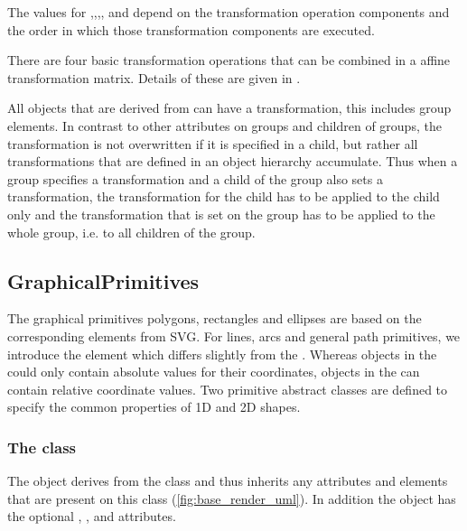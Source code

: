 The values for ,,,, and  depend on the transformation operation components and the order in which those transformation components are executed.

There are four basic transformation operations that can be combined in a affine transformation matrix.  Details of these are given in .

All objects that are derived from \TransformationTwoD can have a transformation, this includes group elements. In contrast to other attributes on groups and children of groups, the transformation is not overwritten if it is specified in a child, but rather all transformations that are defined in an object hierarchy accumulate. Thus when a group specifies a transformation and a child of the group also sets a transformation, the transformation for the child has to be applied to the child only and the transformation that is set on the group has to be applied to the whole group, i.e. to all children of the group.

\subsection{GraphicalPrimitives}

The graphical primitives polygons, rectangles and ellipses are based on the 
corresponding elements from SVG. For lines, arcs and general path primitives, we 
introduce the \RenderCurve element which differs slightly from the \LayoutPackage {}. 
Whereas  objects in the \LayoutPackage could only contain 
absolute values for their coordinates, \RenderPoint objects in the \RenderPackage 
can contain relative coordinate values.  Two primitive abstract classes are defined to specify the common properties of 1D and 2D shapes.


\subsubsection{The  class}
\label{graphicalprimitiveoned-class}

The \GraphicalPrimitiveOneD object derives from the \TransformationTwoD
class and thus inherits any attributes and elements that are present on
this class (\ref{fig:base_render_uml}).
In addition the \GraphicalPrimitiveOneD object has the optional , ,  and  attributes.

